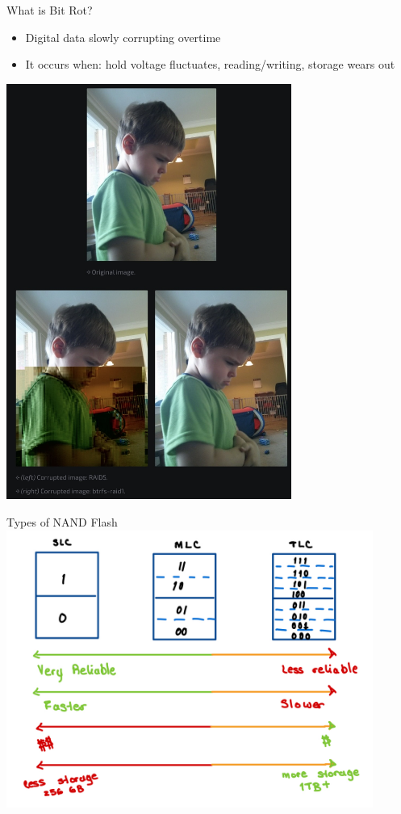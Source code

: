 \begin{frame}{What is Bit Rot?}
    \begin{itemize}
        \item Digital data slowly corrupting overtime
        \item It occurs when: hold voltage fluctuates, reading/writing, storage wears out
    \end{itemize}
    \centering
    \includegraphics[height=0.7\textheight,width=0.7\textwidth,keepaspectratio]{images/bit_flip.png}
\end{frame}

\begin{frame}{Types of NAND Flash}
    \centering
    \includegraphics[height=0.9\textheight,width=0.9\textwidth,keepaspectratio]{images/flash_types.png}
\end{frame}

